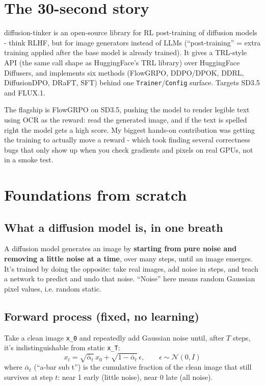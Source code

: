 \documentclass[11pt]{article}
\newcommand{\code}[1]{\texttt{\small #1}}
\begin{document}
\section{The 30-second story}

diffusion-tinker is an open-source library for RL post-training of diffusion models
- think RLHF, but for image generators instead of LLMs (``post-training'' = extra
training applied after the base model is already trained). It gives a TRL-style API
(the same call shape as HuggingFace's TRL library) over HuggingFace Diffusers, and
implements six methods (FlowGRPO, DDPO/DPOK, DDRL, DiffusionDPO, DRaFT, SFT) behind
one \code{Trainer}/\code{Config} surface. Targets SD3.5 and FLUX.1.

The flagship is FlowGRPO on SD3.5, pushing the model to render legible text using OCR
as the reward: read the generated image, and if the text is spelled right the model
gets a high score. My biggest hands-on contribution was getting the training to
actually move a reward - which took finding several correctness bugs that only show
up when you check gradients and pixels on real GPUs, not in a smoke test.

\section{Foundations from scratch}

\subsection{What a diffusion model is, in one breath}

A diffusion model generates an image by \textbf{starting from pure noise and removing
a little noise at a time}, over many steps, until an image emerges. It's trained by
doing the opposite: take real images, add noise in steps, and teach a network to
predict and undo that noise. ``Noise'' here means random Gaussian pixel values, i.e.
random static.

\subsection{Forward process (fixed, no learning)}

Take a clean image \code{x\_0} and repeatedly add Gaussian noise until, after $T$
steps, it's indistinguishable from static \code{x\_T}:
\[
x_t = \sqrt{\bar\alpha_t}\, x_0 + \sqrt{1-\bar\alpha_t}\,\epsilon, \qquad \epsilon\sim\mathcal N(0,I)
\]
where $\bar\alpha_t$ (``a-bar sub t'') is the cumulative fraction of the clean image
that still survives at step $t$: near 1 early (little noise), near 0 late (all noise).
\end{document}
